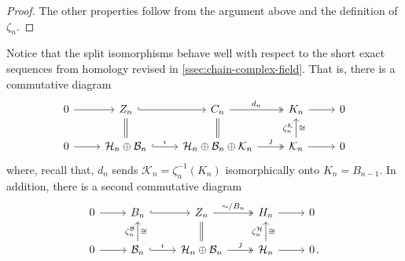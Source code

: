 \documentclass[11pt, table, nothms]{amsart}
\theoremstyle{definition}
\newcommand{\B}{\mathcal{B}}
\newcommand{\cK}{\mathcal{K}}
\newcommand{\cH}{\mathcal{H}}
\begin{document}
{\begin{proof}
The other properties follow from the argument above and the definition of $\zeta_n$.
\end{proof}
Notice that the split isomorphisms behave well with respect to the short exact sequences from homology revised in \cref{ssec:chain-complex-field}. 
That is, there is a commutative diagram
\[
\begin{tikzcd}
    0 \ar[r] &
    Z_n \ar[r, hookrightarrow ] \ar[d, equal] &
    C_n \ar[r, "d_n", twoheadrightarrow] \ar[d, equal] &
    K_n \ar[r] &
    0 \\
    0 \ar[r] &
    \cH_n \oplus \B_n \ar[r, hookrightarrow, "\imath" ] &
    \cH_n \oplus \B_n \oplus \cK_n \ar[r, twoheadrightarrow, "\jmath"] &
    \cK_n \ar[r] \ar{u}{\zeta^\cK_n}[swap]{\cong} &
    0 
\end{tikzcd}
\]
where, recall that, $d_n$ sends $\cK_n = \zeta^{-1}_n(K_n)$ isomorphically onto $K_n=B_{n-1}$. 
In addition, there is a second commutative diagram
\[
\begin{tikzcd}
    0 \ar[r] &
    B_n \ar[r, hookrightarrow ]  &
    Z_n \ar[r, "\sim / B_n", twoheadrightarrow] \ar[d, equal] &
    H_n \ar[r] &
    0 \\
    0 \ar[r] &
    \B_n \ar[r, hookrightarrow, "\imath" ] \ar{u}{\zeta^\B_n}[swap]{\cong} &
    \cH_n \oplus \B_n \ar[r,  twoheadrightarrow, "\jmath"] &
    \cH_n \ar[r]  \ar{u}{\zeta^\cH_n}[swap]{\cong}  &
    0 & [-1.1cm] .
\end{tikzcd}
\]



}
\end{document}
